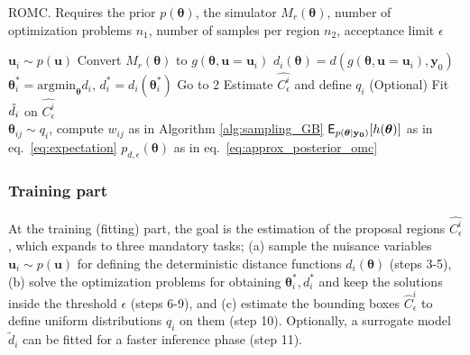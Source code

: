 \documentclass[nojss]{jss}
\newcommand{\ub}{\mathbf{u}}
\newcommand{\yb}{\mathbf{y}}
\newcommand{\thetab}{\boldsymbol{\theta}}
\newcommand{\data}{\mathbf{y_0}}
\newcommand{\accregioni}{C^i_{\epsilon}}
\newcommand{\accregionihat}{\hat{C}^i_{\epsilon}}
\begin{document}
\begin{algorithm}[!ht]
  \caption{ROMC. Requires the prior \( p(\thetab) \), the simulator
    \(M_r(\thetab)\), number of optimization problems \(n_1\), number
    of samples per region \(n_2\), acceptance limit
    \(\epsilon\)}\label{alg:romc_algorithm}
  \begin{algorithmic}[1]
    \State \(\ub_i \sim p(\ub)\) 
    \State Convert \(M_r(\thetab) \) to \( g(\thetab, \ub=\ub_i) \) 
      \State \( d_i(\thetab) = d(g(\thetab, \ub=\ub_i), \yb_0) \) 
      \State \(\thetab_i^* = \text{argmin}_{\thetab} d_i\), \(d_i^*=d_i(\thetab_i^*)\) 
        \State Go to 2 
      \EndIf
      \State Estimate \(\hat{\accregioni}\) and define \(q_i\) 
      \State (Optional) Fit \(\Tilde{d}_i\) on \(\hat{\accregioni}\) 
      \\\hrulefill
      \State \(\thetab_{ij} \sim q_i\), compute \(w_{ij}\) as in Algorithm \ref{alg:sampling_GB} 
      \EndFor
    \EndFor
    \State \(\E_{p(\thetab|\data)}[h(\thetab)]\) as in eq.~\eqref{eq:expectation} 
    \State \(p_{d,\epsilon}(\thetab) \) as in eq.~\eqref{eq:approx_posterior_omc} 
    \EndProcedure
  \end{algorithmic}
\end{algorithm}

\subsubsection*{Training part}
\noindent
At the training (fitting) part, the goal is the estimation of the
proposal regions \(\hat{\accregioni}\), which expands to three
mandatory tasks; (a) sample the nuisance variables
\(\ub_i \sim p(\ub)\) for defining the deterministic distance
functions \(d_i(\thetab)\) (steps 3-5), (b) solve the optimization
problems for obtaining \(\thetab_i^*, d_i^*\) and keep the solutions
inside the threshold \(\epsilon\) (steps 6-9), and (c) estimate the
bounding boxes \(\accregionihat\) to define uniform distributions
\(q_i\) on them (step 10). Optionally, a surrogate model
\(\tilde{d}_i\) can be fitted for a faster inference phase (step 11).
\end{document}
